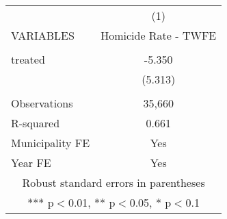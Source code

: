 \documentclass[]{article}
\begin{document}
\begin{tabular}{lc} \hline
 & (1) \\
VARIABLES & Homicide Rate - TWFE \\ \hline
 &  \\
treated & -5.350 \\
 & (5.313) \\
 &  \\
Observations & 35,660 \\
R-squared & 0.661 \\
Municipality FE & Yes \\
 Year FE & Yes \\ \hline
\multicolumn{2}{c}{ Robust standard errors in parentheses} \\
\multicolumn{2}{c}{ *** p$<$0.01, ** p$<$0.05, * p$<$0.1} \\
\end{tabular}
\end{document}
